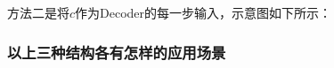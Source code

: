 
方法二是将\(c\)作为Decoder的每一步输入，示意图如下所示：


\subsubsection{以上三种结构各有怎样的应用场景}\label{ux4ee5ux4e0aux4e09ux79cdux7ed3ux6784ux5404ux6709ux600eux6837ux7684ux5e94ux7528ux573aux666f}

